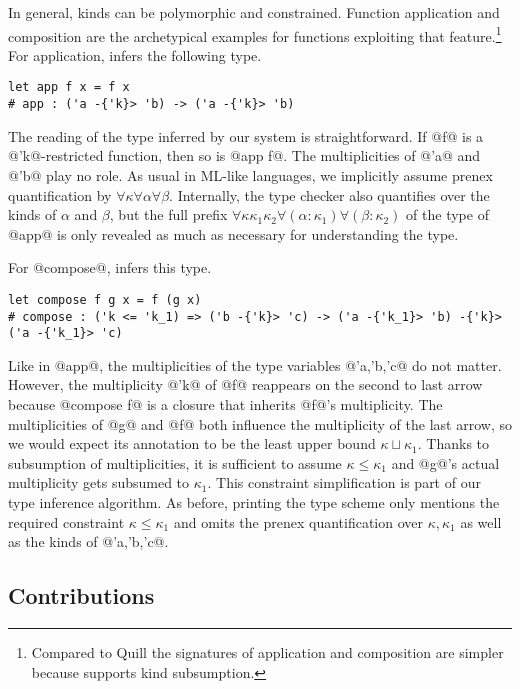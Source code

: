 In general, kinds can be polymorphic and constrained. Function
application and composition are the archetypical
examples for functions exploiting that feature.\footnote{Compared to
  Quill \cite{DBLP:conf/icfp/Morris16} the signatures of application and
  composition are simpler because \lang{} supports kind subsumption.}
For application, \lang{} infers the following type.
\begin{lstlisting}
let app f x = f x
# app : ('a -{'k}> 'b) -> ('a -{'k}> 'b)
\end{lstlisting}
The reading of the type inferred by our system is straightforward. If
@f@ is a @'k@-restricted function, then so is
@app f@. The multiplicities of @'a@ and
@'b@ play no role. As usual in ML-like languages, we
implicitly assume prenex quantification by
$\forall\kappa\forall\alpha\forall\beta$. Internally, the
type checker also quantifies over the kinds of $\alpha$ and $\beta$,
but the full prefix
$\forall\kappa\kappa_1\kappa_2\forall(\alpha:\kappa_1)\forall(\beta:\kappa_2)$
of the type of @app@ is only revealed as much as necessary for
understanding the type. 

For @compose@, \lang{} infers this type.
\begin{lstlisting}
let compose f g x = f (g x)
# compose : ('k <= 'k_1) => ('b -{'k}> 'c) -> ('a -{'k_1}> 'b) -{'k}> ('a -{'k_1}> 'c)
\end{lstlisting}
Like in @app@, the multiplicities of the type variables
@'a,'b,'c@ do not matter. However, the multiplicity
@'k@ of @f@ reappears on the second to last arrow
because @compose f@ is a closure that inherits
@f@'s multiplicity. The multiplicities of @g@  and
@f@ both influence the multiplicity of the last arrow, so
we would expect its annotation to be the least upper bound
$\kappa \sqcup \kappa_1$. Thanks to subsumption of multiplicities, it
is sufficient to assume $\kappa \le \kappa_1$ and @g@'s
actual multiplicity gets subsumed to $\kappa_1$. This constraint
simplification is part of our type inference algorithm. As before,
printing the type scheme only mentions the required constraint 
$\kappa\le\kappa_1$ and omits the prenex quantification over $\kappa,
\kappa_1$ as well as the kinds of @'a,'b,'c@.

\lstDeleteShortInline@

\subsection{Contributions}
\label{sec:contributions}

